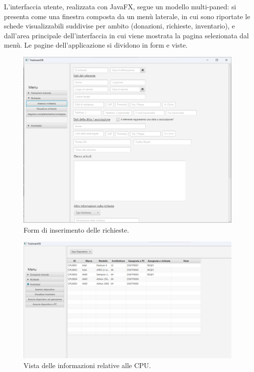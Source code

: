 \documentclass[a4paper,12pt]{report}
\begin{document}
\noindent L'interfaccia utente, realizzata con JavaFX, segue un modello multi-paned: si presenta come una finestra composta da un menù laterale, in cui sono riportate le schede visualizzabili suddivise per ambito (donazioni, richieste, inventario), e dall'area principale dell'interfaccia in cui viene mostrata la pagina selezionata dal menù. Le pagine dell'applicazione si dividono in form e viste. \\

\begin{figure}[H]
	\centering
	\includegraphics[width=\textwidth]{images/form-screen.png}
    \caption{Form di inserimento delle richieste.}
\end{figure}

\begin{figure}[H]
	\centering
	\includegraphics[width=\textwidth]{images/view-screen.png}
    \caption{Vista delle informazioni relative alle CPU.}
\end{figure}
\end{document}
